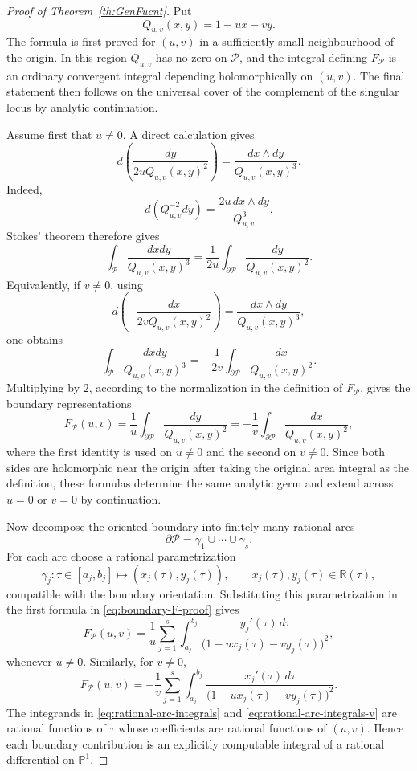 \documentclass[10pt,a4paper]{amsart}
\newcommand {\bP} {\mathbb {P}}
\newcommand {\bR} {\mathbb R}
\newcommand {\cP} {\mathcal P}
\begin{document}
\begin{proof}[Proof of Theorem~\ref{th:GenFucnt}]
Put
\[
        Q_{u,v}(x,y)=1-ux-vy.
\]
The formula is first proved for $(u,v)$ in a sufficiently small neighbourhood of the origin.  In this region $Q_{u,v}$ has no zero on $\overline{\cP}$, and the integral defining $F_{\cP}$ is an ordinary convergent integral depending holomorphically on $(u,v)$.  The final statement then follows on the universal cover of the complement of the singular locus by analytic continuation.

Assume first that $u\ne 0$.  A direct calculation gives
\[
   d\left(\frac{dy}{2uQ_{u,v}(x,y)^2}\right)
       =\frac{dx\wedge dy}{Q_{u,v}(x,y)^3}.
\]
Indeed,
\[
 d\left(Q_{u,v}^{-2}dy\right)
 =\frac{2u\,dx\wedge dy}{Q_{u,v}^{3}}.
\]
Stokes' theorem therefore gives
\[
  \int_{\cP}\frac{dxdy}{Q_{u,v}(x,y)^3}
   =\frac{1}{2u}\int_{\partial\cP}\frac{dy}{Q_{u,v}(x,y)^2}.
\]
Equivalently, if $v\ne0$, using
\[
   d\left(-\frac{dx}{2vQ_{u,v}(x,y)^2}\right)
       =\frac{dx\wedge dy}{Q_{u,v}(x,y)^3},
\]
one obtains
\[
  \int_{\cP}\frac{dxdy}{Q_{u,v}(x,y)^3}
   =-\frac{1}{2v}\int_{\partial\cP}\frac{dx}{Q_{u,v}(x,y)^2}.
\]
Multiplying by $2$, according to the normalization in the definition of $F_{\cP}$, gives the boundary representations
\begin{equation}\label{eq:boundary-F-proof}
 F_{\cP}(u,v)=\frac{1}{u}\int_{\partial\cP}\frac{dy}{Q_{u,v}(x,y)^2}
              =-\frac{1}{v}\int_{\partial\cP}\frac{dx}{Q_{u,v}(x,y)^2},
\end{equation}
where the first identity is used on $u\ne0$ and the second on $v\ne0$.  Since both sides are holomorphic near the origin after taking the original area integral as the definition, these formulas determine the same analytic germ and extend across $u=0$ or $v=0$ by continuation.

Now decompose the oriented boundary into finitely many rational arcs
\[
        \partial\cP=\gamma_1\cup\cdots\cup\gamma_s.
\]
For each arc choose a rational parametrization
\[
        \gamma_j:\tau\in [a_j,b_j]\longmapsto (x_j(\tau),y_j(\tau)),
        \qquad x_j(\tau),y_j(\tau)\in\bR(\tau),
\]
compatible with the boundary orientation.  Substituting this parametrization in the first formula in \eqref{eq:boundary-F-proof} gives
\begin{equation}\label{eq:rational-arc-integrals}
 F_{\cP}(u,v)=\frac{1}{u}
       \sum_{j=1}^s\int_{a_j}^{b_j}
       \frac{y_j'(\tau)\,d\tau}
       {\bigl(1-u x_j(\tau)-v y_j(\tau)\bigr)^2},
\end{equation}
whenever $u\ne0$.  Similarly, for $v\ne0$,
\begin{equation}\label{eq:rational-arc-integrals-v}
 F_{\cP}(u,v)=-\frac{1}{v}
       \sum_{j=1}^s\int_{a_j}^{b_j}
       \frac{x_j'(\tau)\,d\tau}
       {\bigl(1-u x_j(\tau)-v y_j(\tau)\bigr)^2}.
\end{equation}
The integrands in \eqref{eq:rational-arc-integrals} and \eqref{eq:rational-arc-integrals-v} are rational functions of $\tau$ whose coefficients are rational functions of $(u,v)$.  Hence each boundary contribution is an explicitly computable integral of a rational differential on $\bP^1$.


\end{proof}
\end{document}
